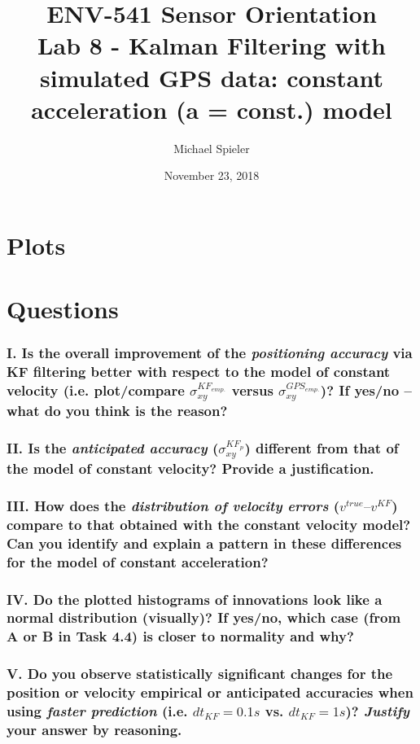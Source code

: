 \documentclass{article}
\title{ENV-541 Sensor Orientation\\Lab 8 - Kalman Filtering with simulated GPS data: constant acceleration (a = const.) model}
\author{Michael Spieler}
\date{November 23, 2018}
\begin{document}
\maketitle

\section*{Plots}

\section*{Questions}


\subsubsection*{I. Is the overall improvement of the \textit{positioning accuracy} via KF filtering better with
respect to the model of constant velocity (i.e. plot/compare $\sigma_{xy}^{KF_{emp.}}$ versus $\sigma_{xy}^{GPS_{emp.}}$)?
If yes/no – what do you think is the reason?}

\subsubsection*{II. Is the \textit{anticipated accuracy} ($\sigma_{xy}^{KF_{p}}$) different from that of the model of constant
velocity? Provide a justification.}

\subsubsection*{III. How does the \textit{distribution of velocity errors} ($v^{true} – v^{KF}$) compare to that obtained
with the constant velocity model? Can you identify and explain a pattern in these
differences for the model of constant acceleration?}

\subsubsection*{IV. Do the plotted histograms of innovations look like a normal distribution (visually)?
If yes/no, which case (from A or B in Task 4.4) is closer to normality and why?}

\subsubsection*{V. Do you observe statistically significant changes for the position or velocity
empirical or anticipated accuracies when using \textit{faster prediction} (i.e. $dt_{KF}=0.1s$ vs.
$dt_{KF}=1s$)? \textit{Justify} your answer by reasoning.}
\end{document}
